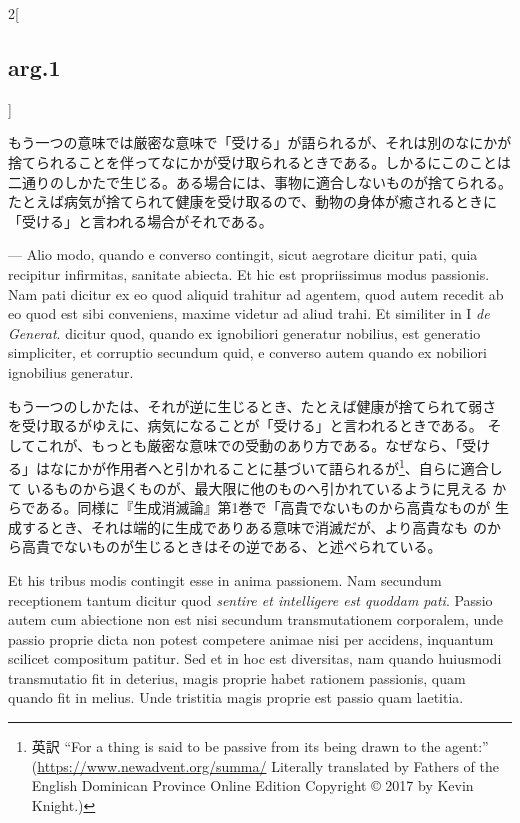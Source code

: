 \documentclass[paper=a4paper,fontsize=10pt,jafontsize=9pt,titlepage]{jlreq}
\begin{document}
\begin{paracol}{2}[\subsection{arg.1}]
\switchcolumn

もう一つの意味では厳密な意味で「受ける」が語られるが、それは別のなにかが
捨てられることを伴ってなにかが受け取られるときである。しかるにこのことは
二通りのしかたで生じる。ある場合には、事物に適合しないものが捨てられる。
 たとえば病気が捨てられて健康を受け取るので、動物の身体が癒されるときに
「受ける」と言われる場合がそれである。

\switchcolumn*

--- Alio modo, quando e converso contingit,
 sicut aegrotare dicitur pati, quia recipitur infirmitas, sanitate
 abiecta. Et hic est propriissimus modus passionis. Nam pati dicitur ex
 eo quod aliquid trahitur ad agentem, quod autem recedit ab eo quod est
 sibi conveniens, maxime videtur ad aliud trahi. Et similiter in I {\itshape de
 Generat}. dicitur quod, quando ex ignobiliori generatur nobilius, est
 generatio simpliciter, et corruptio secundum quid, e converso autem
 quando ex nobiliori ignobilius generatur.

\switchcolumn

もう一つのしかたは、それが逆に生じるとき、たとえば健康が捨てられて弱さ
を受け取るがゆえに、病気になることが「受ける」と言われるときである。
そしてこれが、もっとも厳密な意味での受動のあり方である。なぜなら、「受け
る」はなにかが作用者へと引かれることに基づいて語られるが\footnote{英訳
 ``For a thing is said to be passive from its being drawn to the
 agent:'' (\url{https://www.newadvent.org/summa/} Literally translated by Fathers of the English Dominican Province
Online Edition Copyright {\copyright} 2017 by Kevin Knight.)}、自らに適合して
 いるものから退くものが、最大限に他のものへ引かれているように見える
 からである。同様に『生成消滅論』第1巻で「高貴でないものから高貴なものが
 生成するとき、それは端的に生成でありある意味で消滅だが、より高貴なも
 のから高貴でないものが生じるときはその逆である、と述べられている。

\switchcolumn*

Et his tribus modis contingit
 esse in anima passionem. Nam secundum receptionem tantum dicitur quod
 {\itshape sentire et intelligere est quoddam pati}. Passio autem cum abiectione
 non est nisi secundum transmutationem corporalem, unde passio proprie
 dicta non potest competere animae nisi per accidens, inquantum scilicet
 compositum patitur. Sed et in hoc est diversitas, nam quando huiusmodi
 transmutatio fit in deterius, magis proprie habet rationem passionis,
 quam quando fit in melius. Unde tristitia magis proprie est passio quam
 laetitia.


\end{paracol}
\end{document}
